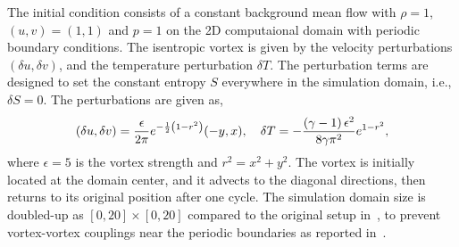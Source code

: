 The initial condition consists of a constant background mean flow with \( \rho = 1 \),
\( (u, v) = (1,1) \) and \( p =1 \) on the 2D computaional domain
with periodic boundary conditions.
The isentropic vortex is given by the velocity perturbations \( (\delta u, \delta v) \),
and the temperature perturbation \( \delta T \).
The perturbation terms are designed to set the constant entropy \( S \)
everywhere in the simulation domain, i.e., \( \delta S = 0 \).
The perturbations are given as,
\begin{equation}\label{eq:isentropic_vortex_initial}
    \left( \delta u, \delta v \right) = \frac{\epsilon}{2 \pi} e^{-\frac{1}{2} \left( 1 - r^{2} \right)} (-y, x), \quad
    \delta T = - \frac{\left( \gamma - 1 \right) \epsilon^{2}}{8 \gamma \pi^{2}} e^{1 - r^{2}},
\end{equation}
where \( \epsilon = 5 \) is the vortex strength and \( r^{2} = x^{2} + y^{2} \).
The vortex is initially located at the domain center,
and it advects to the diagonal directions, then returns to its original position after one cycle.
The simulation domain size is doubled-up as \( [0, 20] \times [0, 20] \)
compared to the original setup in~\cite{shu1998essentially},
to prevent vortex-vortex couplings near the periodic boundaries
as reported in~\cite{spiegel2015survey}.


